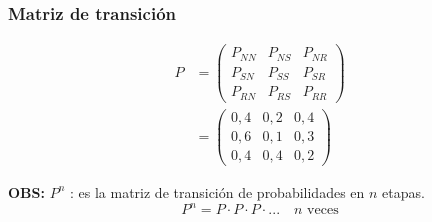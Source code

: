 \documentclass{templateNote}
\begin{document}
\subsubsection*{Matriz de transici\'on}
\begin{align*}
    P &= \left(\begin{matrix}
        P_{NN} & P_{NS} & P_{NR} \\
        P_{SN} & P_{SS} & P_{SR} \\
        P_{RN} & P_{RS} & P_{RR}
    \end{matrix} \right) \\
    &= \left(\begin{matrix}
        0,4 & 0,2 & 0,4 \\
        0,6 & 0,1 & 0,3 \\
        0,4 & 0,4 & 0,2
    \end{matrix} \right)
\end{align*}

\textbf{OBS:} $P^n$ : es la matriz de transici\'on de probabilidades en $n$ etapas. 
\begin{equation*}
    P^n = P \cdot P \cdot P \cdot ... \quad n \text{ veces}
\end{equation*}
\newpage
\end{document}
